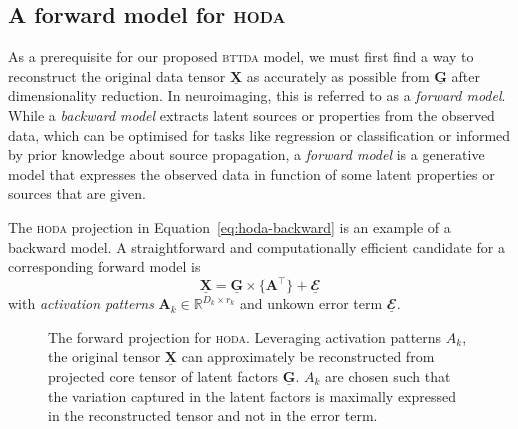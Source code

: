 \documentclass[twocolumn]{article}
\newcommand{\ten}[1]{\underline{\mathbf{#1}}} %
\newcommand{\mat}[1]{\mathbf{#1}} %
\newcommand{\mmpr}[1]{\times\{#1\}} %
\begin{document}
\subsection{A forward model for \textsc{hoda}}
As a prerequisite for our proposed \textsc{bttda} model, we must first find a
way to reconstruct the original data tensor $\ten{X}$ as accurately as possible
from $\ten{G}$ after dimensionality reduction.
In neuroimaging, this is referred to as a \textit{forward model}.
While a \textit{backward model} extracts latent sources or properties from the observed
data, which can be optimised for tasks like regression or classification or
informed by prior knowledge about source propagation, a \textit{forward model} is a
generative model that expresses the observed data in function of some latent
properties or sources that are given.

The \textsc{hoda} projection in Equation~\ref{eq:hoda-backward} is an example
of a backward model.
A straightforward and computationally efficient candidate for a corresponding
forward model is
\begin{equation}
	\ten{X} = \ten{G}\mmpr{\mat{A}^\intercal} + \ten{\mathbfcal{E}}
	\label{eq:hoda-forward}
\end{equation}
with \textit{activation patterns} $\mat{A}_k \in \mathbb{R}^{D_k\times r_k}$
and unkown error term $\ten{\mathbfcal{E}}$.
\begin{figure}
	\centering
	
	\caption{The forward projection for \textsc{hoda}. Leveraging activation
		patterns $A_k$, the original tensor $\ten{X}$ can approximately be
		reconstructed from projected core tensor of latent factors $\ten{G}$. $A_k$ are chosen such
		that the variation captured in the latent factors is maximally expressed in
		the reconstructed tensor and not in the error term.}
	\label{fig:hoda-forward}
\end{figure}
\end{document}

